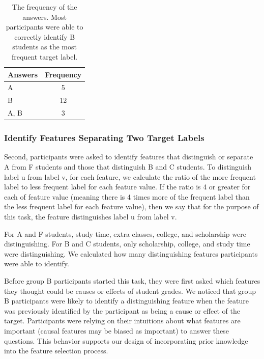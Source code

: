 \begin{table}[]
\centering
\begin{tabular}{lc}
\hline
Answers & Frequency \\ \hline
A       & 5       \\
B       & 12         \\
A, B    & 3        \\ \hline
\end{tabular}
\caption{The frequency of the answers. Most participants were able to correctly identify B students as the most frequent target label.}
\label{InterpretFS1}
\end{table}

\subsubsection { Identify Features Separating Two Target Labels }

Second, participants were asked to identify features that distinguish or separate A from F students and those that distinguish B and C students.  To distinguish label u from label v, for each feature, we calculate the ratio of the more frequent label to less frequent label for each feature value. If the ratio is 4 or greater for each of feature value (meaning there is 4 times more of the frequent label than the less frequent label for each feature value), then we say that for the purpose of this task, the feature distinguishes label u from label v.

For A and F students, study time, extra classes, college, and scholarship were distinguishing. For B and C students, only scholarship, college, and study time were distinguishing. We calculated how many distinguishing features participants were able to identify.

Before group B participants started this task, they were first asked which features they thought could be causes or effects of student grades. We noticed that group B participants were likely to identify a distinguishing feature when the feature was previously identified by the participant as being a cause or effect of the target. Participants were relying on their intuitions about what features are important (causal features may be biased as important) to answer these questions. This behavior supports our design of incorporating prior knowledge into the feature selection process.

